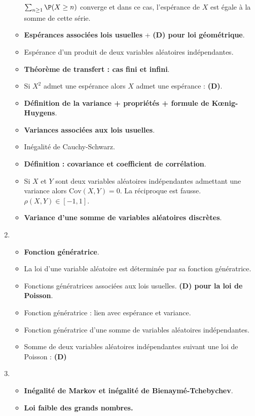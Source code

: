 \documentclass[twoside,a4paper,french,10pt]{VcCours}
\begin{document}
\begin{enumerate}
\begin{itemize}
  $\sum_{n \geq 1} \P(X \geq n)$
  converge et dans ce cas, l'espérance de $X$ est égale à la somme de cette série.
  \item \textbf{Espérances associées lois usuelles} + \textbf{(D) pour loi géométrique}.
  \item Espérance d'un produit de deux variables aléatoires indépendantes.
  \item \textbf{Théorème de transfert : cas fini et infini}. 
  \item Si $X^2$ admet une espérance alors $X$ admet une espérance : \textbf{(D)}.
  \item \textbf{Définition de la variance + propriétés + formule de Kœnig-Huygens}.
  \item \textbf{Variances associées aux lois usuelles}.
  \item Inégalité de Cauchy-Schwarz.
  \item \textbf{Définition : covariance et coefficient de corrélation}.
  \item Si $X$ et $Y$ sont deux variables aléatoires indépendantes admettant une variance alors $\textrm{Cov}(X,Y)=0$. La réciproque est fausse.
  $\rho(X,Y) \in [-1,1]$.
  \item \textbf{Variance d'une somme de variables aléatoires discrètes}.
  \end{itemize}
  \item
  \begin{itemize}
  \item \textbf{Fonction génératrice}.
  \item La loi d'une variable aléatoire est déterminée par sa fonction génératrice.
  \item Fonctions génératrices associées aux lois usuelles. \textbf{(D) pour la loi de Poisson}.
  \item Fonction génératrice : lien avec espérance et variance.
  \item Fonction génératrice d'une somme de variables aléatoires indépendantes.
  \item Somme de deux variables aléatoires indépendantes suivant une loi de Poisson : \textbf{(D)}
  \end{itemize}
  \item
  \begin{itemize}
  \item \textbf{Inégalité de Markov et inégalité de Bienaymé-Tchebychev}.
  \item \textbf{Loi faible des grands nombres.}
  \end{itemize}
  \end{enumerate}
  
\end{document}
